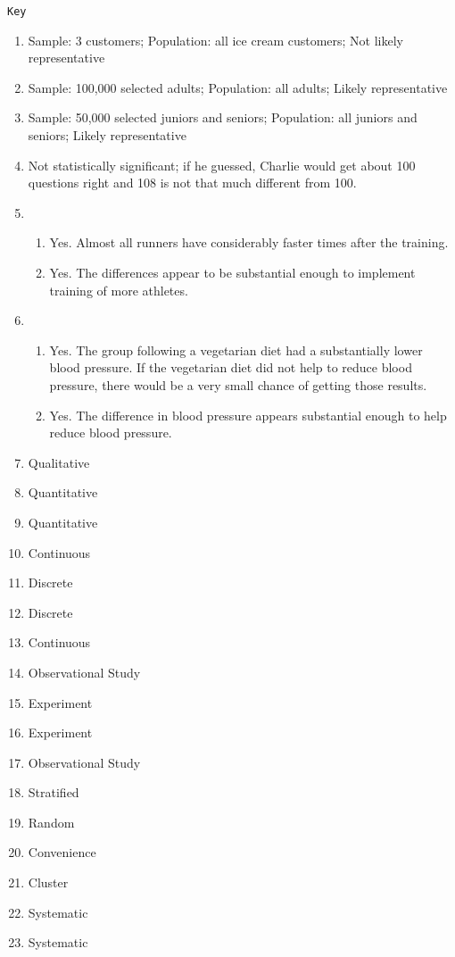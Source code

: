 \documentclass{article}
\begin{document}
\texttt{Key}
\begin{enumerate}
    \item Sample: 3 customers; Population: all ice cream customers; Not likely representative
    \item Sample: 100,000 selected adults; Population: all adults; Likely representative
    \item Sample: 50,000 selected juniors and seniors; Population: all juniors and seniors; Likely representative
    
    \item Not statistically significant; if he guessed, Charlie would get about 100 questions right and 108 is not that much different from 100.
    \item 
    \begin{enumerate}
        \item Yes. Almost all runners have considerably faster times after the training.
        \item Yes. The differences appear to be substantial enough to implement training of more athletes.
    \end{enumerate}
    \item 
    \begin{enumerate}
        \item Yes. The group following a vegetarian diet had a substantially lower blood pressure. If the vegetarian diet did not help to reduce blood pressure, there would be a very small chance of getting those results.
        \item Yes. The difference in blood pressure appears substantial enough to help reduce blood pressure.
    \end{enumerate}
    
    \item Qualitative
    \item Quantitative
    \item Quantitative
    
    \item Continuous
    \item Discrete
    \item Discrete
    \item Continuous
    
    \item Observational Study
    \item Experiment
    \item Experiment
    \item Observational Study
    
    \item Stratified
    \item Random
    \item Convenience
    \item Cluster
    \item Systematic
    \item Systematic
\end{enumerate}
\end{document}
